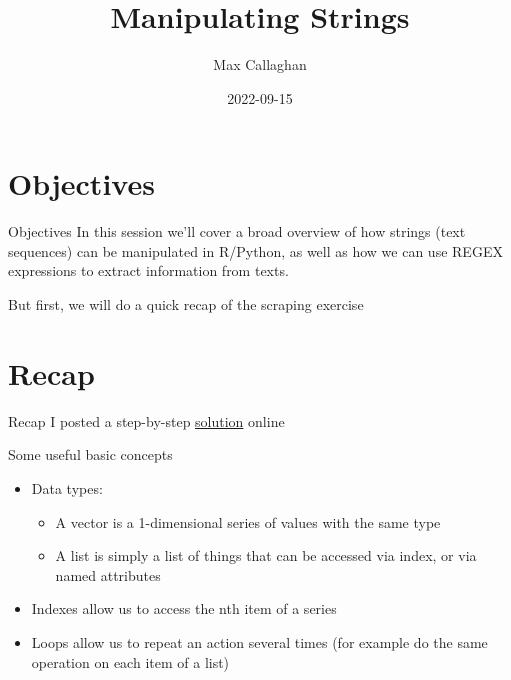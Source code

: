 \documentclass[
  10pt,
  ignorenonframetext,
  aspectratio=169]{beamer}
\title{Manipulating Strings}
\author{Max Callaghan}
\date{2022-09-15}
\providecommand{\tightlist}{%
  \setlength{\itemsep}{0pt}\setlength{\parskip}{0pt}}
\begin{document}
\frame{\titlepage}

\hypertarget{objectives}{%
\section{Objectives}\label{objectives}}

\begin{frame}{Objectives}
\protect\hypertarget{objectives-1}{}
In this session we'll cover a broad overview of how strings (text
sequences) can be manipulated in R/Python, as well as how we can use
REGEX expressions to extract information from texts.

\medskip

But first, we will do a quick recap of the scraping exercise
\end{frame}

\hypertarget{recap}{%
\section{Recap}\label{recap}}

\begin{frame}{Recap}
\protect\hypertarget{recap-1}{}
I posted a step-by-step
\href{https://github.com/mcallaghan/text-as-data/blob/master/Session-3-acquiring-reading/scraping_iea.html}{solution}
online

Some useful basic concepts

\begin{itemize}
\tightlist
\item
  Data types:

  \begin{itemize}
  \tightlist
  \item
    A vector is a 1-dimensional series of values with the same type
  \item
    A list is simply a list of things that can be accessed via index, or
    via named attributes
  \end{itemize}
\item
  Indexes allow us to access the nth item of a series
\item
  Loops allow us to repeat an action several times (for example do the
  same operation on each item of a list)
\end{itemize}
\end{frame}
\end{document}
